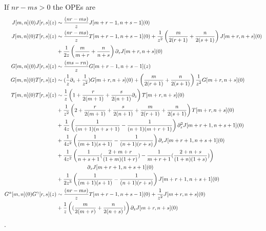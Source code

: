 \documentclass[../main.tex]{subfiles}
\begin{document}
If $nr-ms > 0$ the OPEs are
\begin{align}
J[m,n](0)J[r, s](z) &\sim {(nr-ms) \over z}J[m + r -1, n + s -1](0) \\
J[m, n](0)T[r, s](z) &\sim {(nr-ms) \over z}T[m + r -1, n + s -1](0) + {1 \over z^2}\left({m \over 2(r + 1)} + {n \over 2(s + 1)}\right)J[m + r, n + s](0) \\ \nonumber
&+{1 \over 2 z}\left({m \over m + r} + {n \over n + s} \right)\partial_z J[m + r, n + s](0)\\
G[m, n](0)J[r, s](z) &\sim {(ms - rn) \over z}G[m + r -1, n + s - 1](z) \\
G[m, n](0)T[r, s](z) &\sim ({1 \over z} \partial_z + {1 \over z^2})G[m + r, n+s](0) + \left({m \over 2(r+1)} + {n \over 2 (s + 1)}\right){1 \over z^2}G[m + r, n+s](0) \\
T[m, n](0)T[r, s](z) &\sim {1 \over z}\left(1 + {r \over 2(m+1)} + {s \over 2(n+1)}\partial_z \right) T[m + r, n +s](0) \\ \nonumber &+ {1 \over z^2}\left(2 + {r \over 2(m+1)} + {s \over 2(n+1)} + {m \over 2(r+1)} + {n \over 2(s+1)} \right)T[m + r, n + s](0)\\ \nonumber
&+{1 \over 4 z}\left({1 \over (m + 1)(n + s + 1)}- {1 \over (n +1)(m + r + 1)} \right) \partial^2_z J[m + r  +1, n + s +1](0) \\ \nonumber
&+{1 \over 4 z^2}\left({1 \over (m + 1)(s + 1)}- {1 \over (n+1)(r + s)}\right)\partial_z J[m + r + 1, n + s + 1](0) \\ \nonumber 
&+ {1 \over 4 z^2}\left({1 \over n + s + 1}({2 + m + r \over (1 + m)(1 + r)}) - {1 \over m + r + 1}({2 + n + s \over (1 + n)(1 + s)}) \right) \\ \nonumber & \ \ \ \ \ \ \ \ \ \ \ \ \ \ \ \ \ \partial_z J[m + r + 1, n + s + 1](0) \\ \nonumber
&+{1 \over 2 z^3}\left( {1 \over (m + 1)(s + 1)}- {1 \over (n+1)(r + s)}\right) J[m + r + 1, n + s + 1](0) \\ \nonumber
G^{\alpha}[m, n](0)G^{\gamma}[r, s](z) &\sim {(nr-ms) \over z}T[m + r -1, n + s -1](0) + {1 \over z^2}J[m + r, n + s](0) \\ \nonumber
&+{1 \over z}\left(({m \over 2 (m + r)} + {n \over 2 (n + s)})\right)\partial_z J[m + r, n+s](0)
\end{align}. 
\end{document}
